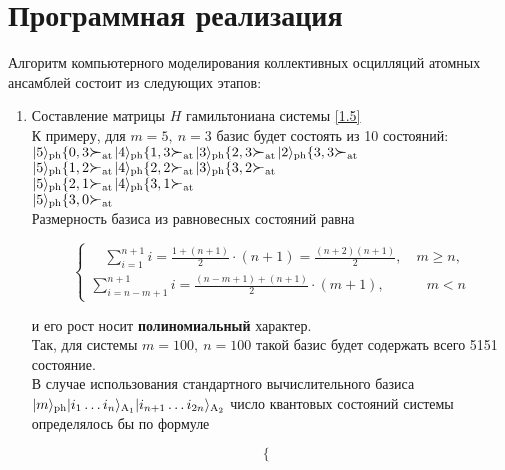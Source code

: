 \clearpage
\section{Программная реализация}

Алгоритм компьютерного моделирования коллективных осцилляций атомных ансамблей состоит из следующих этапов:
\begin{enumerate}
\item{
	Составление матрицы $H$ гамильтониана системы \eqref{1.5}\\[24pt]
	К примеру, для $m = 5,~n = 3$ базис будет состоять из 10 состояний:\\
	$|5\ra_{\mathrm{ph}}\{0, 3\Succ_{\mathrm{at}}$\qquad$|4\ra_{\mathrm{ph}}\{1, 3\Succ_{\mathrm{at}}$\qquad$|3\ra_{\mathrm{ph}}\{2, 3\Succ_{\mathrm{at}}$\qquad$|2\ra_{\mathrm{ph}}\{3, 3\Succ_{\mathrm{at}}$\\
	$|5\ra_{\mathrm{ph}}\{1, 2\Succ_{\mathrm{at}}$\qquad$|4\ra_{\mathrm{ph}}\{2, 2\Succ_{\mathrm{at}}$\qquad$|3\ra_{\mathrm{ph}}\{3, 2\Succ_{\mathrm{at}}$\\
	$|5\ra_{\mathrm{ph}}\{2, 1\Succ_{\mathrm{at}}$\qquad$|4\ra_{\mathrm{ph}}\{3, 1\Succ_{\mathrm{at}}$\\
	$|5\ra_{\mathrm{ph}}\{3, 0\Succ_{\mathrm{at}}$\\[24pt]
	Размерность базиса из равновесных состояний равна
	\begin{fleqn}
	\begin{equation}
		\begin{cases}
		\displaystyle\quad\sum\limits_{i=1}^{n+1}i = \frac{1 + (n+1)}{2} \cdot (n+1) = \frac{(n+2)(n+1)}{2},\quad m \ge n,\\[18pt]
		\displaystyle\sum\limits_{i=n-m+1}^{n+1}i = \frac{(n-m+1) + (n+1)}{2} \cdot (m+1),\qquad\quad m < n
		\end{cases}		
	\end{equation}
	\end{fleqn}
	и его рост носит \textbf{полиномиальный} характер. 
	\\[24pt]
	Так, для системы $m = 100,~n = 100$ такой базис будет содержать всего 5151 состояние.
	\\[24pt]
	В случае использования стандартного вычислительного базиса $|m\rangle_{\mathrm{ph}}|i_{1} \dots i_{n}\rangle_{\mathrm{A_1}}|i_{n+1} \dots i_{2n}\rangle_{\mathrm{A_2}}$ число квантовых состояний системы определялось бы по формуле
	\begin{fleqn}
	\begin{equation}
		\begin{cases}

\end{cases}
\end{equation}
\end{fleqn}}
\end{enumerate}
